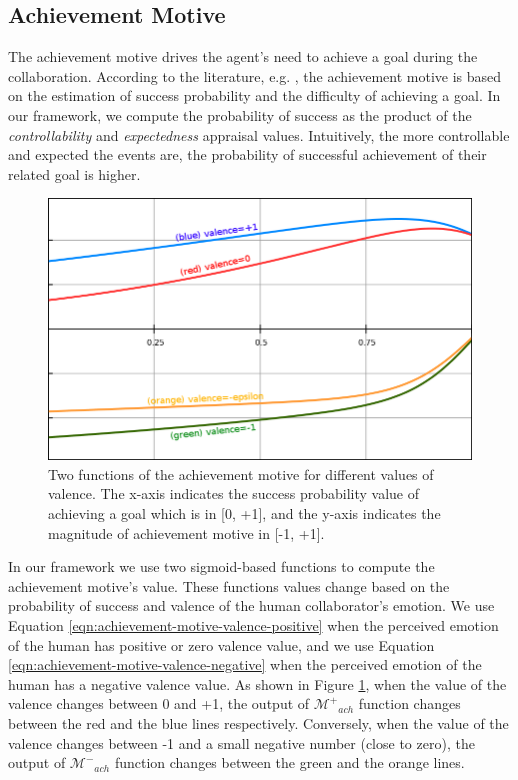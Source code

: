 \documentclass[12pt]{report}
\begin{document}
\subsection{Achievement Motive}
The achievement motive drives the agent's need to achieve a goal during the
collaboration. According to the literature, e.g.
\cite{merrick:acheievement-affiliation-power}, the achievement motive is based
on the estimation of success probability and the difficulty of achieving a goal.
In our framework, we compute the probability of success as the product of the
\textit{controllability} and \textit{expectedness} appraisal values.
Intuitively, the more controllable and expected the events are, the probability
of successful achievement of their related goal is higher.

\begin{figure}[t]
  \centering
  \includegraphics[width=1\textwidth]{figure/achievement_motive_functions.png}
  \caption{Two functions of the achievement motive for different values of
  valence. The x-axis indicates the success probability value of achieving a
  goal which is in [0, +1], and the y-axis indicates the magnitude of
  achievement motive in [-1, +1].}
  \label{fig:achievement-motive-functions}
\end{figure}

In our framework we use two sigmoid-based functions to compute the achievement
motive's value. These functions values change based on the probability of
success and valence of the human collaborator's emotion. We use Equation
\ref{eqn:achievement-motive-valence-positive} when the perceived emotion of the
human has positive or zero valence value, and we use Equation
\ref{eqn:achievement-motive-valence-negative} when the perceived emotion
of the human has a negative valence value. As shown in Figure
\ref{fig:achievement-motive-functions}, when the value of the valence changes
between 0 and +1, the output of $\mathcal{M^{+}}_{ach}$ function changes between
the red and the blue lines respectively. Conversely, when the value of the
valence changes between -1 and a small negative number (close to zero), the
output of $\mathcal{M^{-}}_{ach}$ function changes between the green and the
orange lines.
\end{document}

